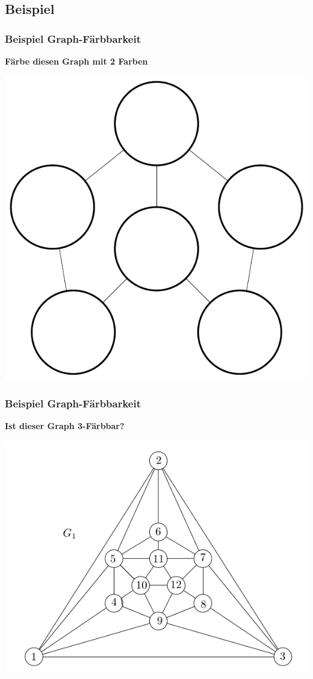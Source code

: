\subsection{Beispiel}
\begin{frame}
	\frametitle{Beispiel Graph-Färbbarkeit}
	\textbf{Färbe diesen Graph mit 2 Farben}
	\begin{center}
	\includegraphics[scale=0.4]{images/Graph_2_Faerben}	
	\end{center}
\end{frame}
\begin{frame}
	\frametitle{Beispiel Graph-Färbbarkeit}
	\textbf{Ist dieser Graph 3-Färbbar?}
	\begin{center}
	\includegraphics[scale=0.4]{images/4_Faerben}	
	\end{center}
\end{frame}

